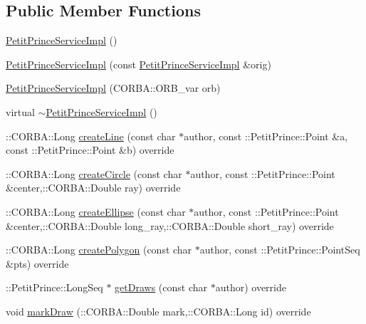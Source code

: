\subsection*{Public Member Functions}
\begin{DoxyCompactItemize}
\item 
\hyperlink{class_petit_prince_service_impl_acb11d35aba248f3ce9ea1a2d9cd654a8}{Petit\+Prince\+Service\+Impl} ()
\item 
\hyperlink{class_petit_prince_service_impl_ac8dc71f547e35e7bb9258e295070cb57}{Petit\+Prince\+Service\+Impl} (const \hyperlink{class_petit_prince_service_impl}{Petit\+Prince\+Service\+Impl} \&orig)
\item 
\hyperlink{class_petit_prince_service_impl_a32477f50eef22f4d24f0992da6199ae8}{Petit\+Prince\+Service\+Impl} (C\+O\+R\+B\+A\+::\+O\+R\+B\+\_\+var orb)
\item 
virtual \hyperlink{class_petit_prince_service_impl_af2198ec89de73b22c98f9944f3b5912f}{$\sim$\+Petit\+Prince\+Service\+Impl} ()
\item 
\+::C\+O\+R\+B\+A\+::\+Long \hyperlink{class_petit_prince_service_impl_a8f30a969622fa0ca7bc88ee5d72bc51c}{create\+Line} (const char $\ast$author, const \+::Petit\+Prince\+::\+Point \&a, const \+::Petit\+Prince\+::\+Point \&b) override
\item 
\+::C\+O\+R\+B\+A\+::\+Long \hyperlink{class_petit_prince_service_impl_a62369775140e067970bbdf544392714c}{create\+Circle} (const char $\ast$author, const \+::Petit\+Prince\+::\+Point \&center,\+::C\+O\+R\+B\+A\+::\+Double ray) override
\item 
\+::C\+O\+R\+B\+A\+::\+Long \hyperlink{class_petit_prince_service_impl_ad69b464b23df4495e29387d07811a2d2}{create\+Ellipse} (const char $\ast$author, const \+::Petit\+Prince\+::\+Point \&center,\+::C\+O\+R\+B\+A\+::\+Double long\+\_\+ray,\+::C\+O\+R\+B\+A\+::\+Double short\+\_\+ray) override
\item 
\+::C\+O\+R\+B\+A\+::\+Long \hyperlink{class_petit_prince_service_impl_a5f7839fea87678e071f39ec019e7b306}{create\+Polygon} (const char $\ast$author, const \+::Petit\+Prince\+::\+Point\+Seq \&pts) override
\item 
\+::Petit\+Prince\+::\+Long\+Seq $\ast$ \hyperlink{class_petit_prince_service_impl_a97ed62c5a6c2fb4d86a23bde084e3c82}{get\+Draws} (const char $\ast$author) override
\item 
void \hyperlink{class_petit_prince_service_impl_abe85dc1a7c705dec3aeac5c56e2f9e98}{mark\+Draw} (\+::C\+O\+R\+B\+A\+::\+Double mark,\+::C\+O\+R\+B\+A\+::\+Long id) override
\end{DoxyCompactItemize}
